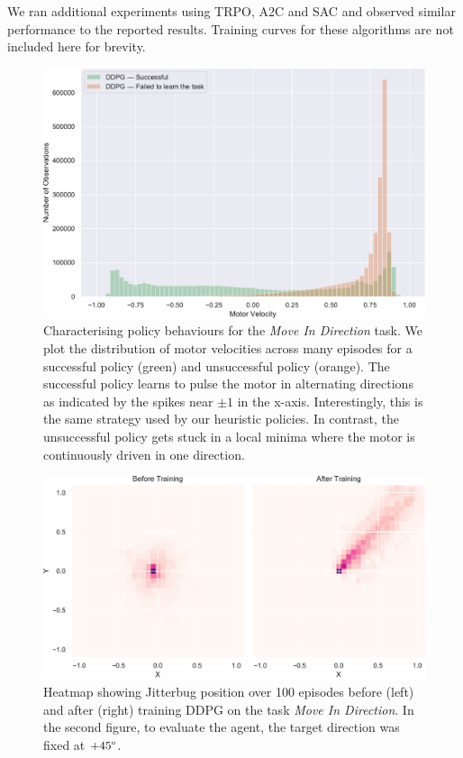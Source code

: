 \documentclass[letterpaper, 10 pt, conference]{ieeeconf}
\begin{document}
We ran additional experiments using TRPO, A2C and SAC and observed similar performance to the reported results.
Training curves for these algorithms are not included here for brevity.


\begin{figure}[t]
    \centering
    \includegraphics[width=\linewidth]{fig-motor-hist}
    \caption{
        Characterising policy behaviours for the \emph{Move In Direction} task.
        We plot the distribution of motor velocities across many episodes for a successful policy (green) and unsuccessful policy (orange).
        The successful policy learns to pulse the motor in alternating directions as indicated by the spikes near $\pm 1$ in the x-axis.
        Interestingly, this is the same strategy used by our heuristic policies.
        In contrast, the unsuccessful policy gets stuck in a local minima where the motor is continuously driven in one direction.
    }
    \label{fig:motor-hist}
\end{figure}

\begin{figure}[t]
    \centering
    \includegraphics[width=\linewidth]{fig-heatmap}
    \caption{
        Heatmap showing Jitterbug position over 100 episodes before (left) and after (right) training DDPG on the task \emph{Move In Direction}.
        In the second figure, to evaluate the agent, the target direction was fixed at $+45\degree$.
    }
    \label{fig:heatmap}
\end{figure}
\end{document}
